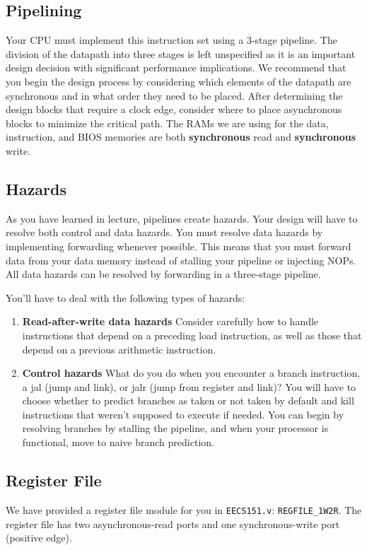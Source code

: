 \documentclass[11pt]{article}
\begin{document}
\subsection{Pipelining}
Your CPU must implement this instruction set using a 3-stage pipeline.
The division of the datapath into three stages is left unspecified as it is an important design decision with significant performance implications.
We recommend that you begin the design process by considering which elements of the datapath are synchronous and in what order they need to be placed.
After determining the design blocks that require a clock edge, consider where to place asynchronous blocks to minimize the critical path.
The RAMs we are using for the data, instruction, and BIOS memories are both \textbf{synchronous} read and \textbf{synchronous} write.

\subsection{Hazards}
As you have learned in lecture, pipelines create hazards.
Your design will have to resolve both control and data hazards.
You must resolve data hazards by implementing forwarding whenever possible.
This means that you must forward data from your data memory instead of stalling your pipeline or injecting NOPs.
All data hazards can be resolved by forwarding in a three-stage pipeline.

You'll have to deal with the following types of hazards:
\begin{enumerate}
  \item \textbf{Read-after-write data hazards} Consider carefully how to handle instructions that depend on a preceding load instruction, as well as those that depend on a previous arithmetic instruction.
  \item \textbf{Control hazards} What do you do when you encounter a branch instruction, a jal (jump and link), or jalr (jump from register and link)?
    You will have to choose whether to predict branches as taken or not taken by default and kill instructions that weren't supposed to execute if needed.
    You can begin by resolving branches by stalling the pipeline, and when your processor is functional, move to naive branch prediction.
\end{enumerate}

\subsection{Register File}
\label{reg_file}
We have provided a register file module for you in \verb|EECS151.v|: \verb|REGFILE_1W2R|. The register file has two asynchronous-read ports and one synchronous-write port (positive edge).
\end{document}
